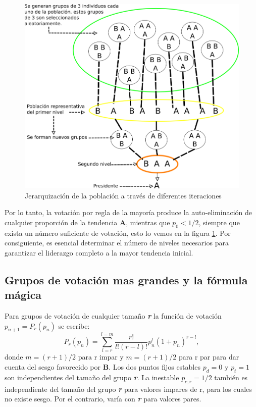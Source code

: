 \begin{figure}[!ht]
    \centering
    \includegraphics[scale=0.50]{TT/img/marco teorico/prediccion.png}
    \caption{Jerarquización de la población a través de diferentes iteraciones}
    \label{graphic:prediccion}
\end{figure}

Por lo tanto, la votación por regla de la mayoría produce la auto-eliminación de cualquier proporción de la tendencia \textbf{A}, mientras que $p_{0} < 1/2$, siempre que exista un número suficiente de votación, esto lo vemos en la figura \ref{graphic:prediccion}. Por consiguiente, es esencial determinar el número de niveles necesarios para garantizar el liderazgo completo a la mayor tendencia inicial. \cite{Galam2008}

\subsection{Grupos de votación mas grandes y la fórmula mágica}
Para grupos de votación de cualquier tamaño \textbf{\textit{r}} la función de votación $p_{n+1} = P_{r}(p_{n})$ se escribe:
\begin{equation}
    P_{r}(p_{n}) = \sum_{l=r}^{l=m} \frac{r!}{l!(r-l)!}p_{n}^{l}(1+p_{n})^{r-l},
\end{equation}
donde $m = (r + 1)/2$ para r impar y $m = (r + 1)/2$ para r par para dar cuenta del sesgo favorecido por \textbf{B}. Los dos puntos fijos estables $p_{d} = 0$ y $p_{t} = 1$ son independientes del tamaño del grupo \textbf{\textit{r}}. La inestable $p_{c,r} = 1/2$ también es independiente del tamaño del grupo \textbf{\textit{r}} para valores impares de r, para los cuales no existe sesgo. Por el contrario, varía con \textbf{\textit{r}} para valores pares. %

